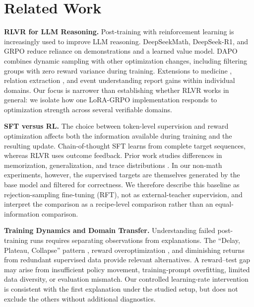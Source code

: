\documentclass[11pt]{article}
\begin{document}
\section{Related Work}

\textbf{RLVR for LLM Reasoning.}
Post-training with reinforcement learning is increasingly used to improve LLM reasoning. DeepSeekMath, DeepSeek-R1, and GRPO \citep{shao2024deepseekmath,deepseekr1} reduce reliance on demonstrations and a learned value model. DAPO \citep{yu2025dapo} combines dynamic sampling with other optimization changes, including filtering groups with zero reward variance during training. Extensions to medicine \citep{med_rlvr}, relation extraction \citep{r1_re}, and event understanding \citep{eventrl} report gains within individual domains. Our focus is narrower than establishing whether RLVR works in general: we isolate how one LoRA-GRPO implementation responds to optimization strength across several verifiable domains.

\textbf{SFT versus RL.}
The choice between token-level supervision and reward optimization affects both the information available during training and the resulting update. Chain-of-thought SFT \citep{wei2022cot} learns from complete target sequences, whereas RLVR uses outcome feedback. Prior work studies differences in memorization, generalization, and trace distributions \citep{sft_memorizes_rl_generalizes,rl_squeezes_sft_expands,yue2025doesrl}. In our non-math experiments, however, the supervised targets are themselves generated by the base model and filtered for correctness. We therefore describe this baseline as rejection-sampling fine-tuning (RFT), not as external-teacher supervision, and interpret the comparison as a recipe-level comparison rather than an equal-information comparison.

\textbf{Training Dynamics and Domain Transfer.}
Understanding failed post-training runs requires separating observations from explanations. The ``Delay, Plateau, Collapse'' pattern \citep{delay_plateau_collapse}, reward overoptimization \citep{gao2023scaling}, and diminishing returns from redundant supervised data \citep{zhou2024lima} provide relevant alternatives. A reward--test gap may arise from insufficient policy movement, training-prompt overfitting, limited data diversity, or evaluation mismatch. Our controlled learning-rate intervention is consistent with the first explanation under the studied setup, but does not exclude the others without additional diagnostics.
\end{document}

